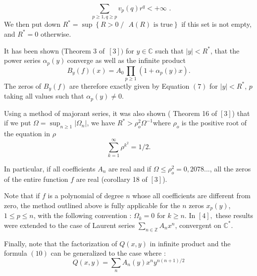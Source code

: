 \documentclass{article}
\begin{document}
\begin{equation}
\text{\ \ }\sum\limits_{p\geq 1,q\geq p}v_{p}\left( q\right) r^{q}<+\infty 
\text{ .}
\end{equation}
We then put down $R^{\ast }=\sup \left\{ R>0\;/\text{ }A\left( R\right) 
\text{ is true}\right\} $ if this set is not empty, and $R^{\ast }=0$
otherwise.

It has been shown (Theorem 3 of\ $\left[ 3\right] )$ for $y\in \mathbb{C}$
such that $\left| y\right| <R^{\ast }$, that the power series $\alpha
_{p}\left( y\right) \ $converge as well as the infinite product 
\begin{equation}
B_{y}\left( f\right) \left( x\right) =A_{0}\prod\limits_{p\geq 1}\left(
1+\alpha _{p}\left( y\right) x\right) \text{.}
\end{equation}
The zeros of $B_{y}\left( f\right) $ are therefore exactly given by Equation 
$\left( 7\right) $ for $\left| y\right| <R^{\ast }$, $p$ taking all values
such that $\alpha _{p}\left( y\right) \neq 0$.

Using a method of majorant series, it was also shown ( Theorem 16 of $\left[
3\right] $) that if we put $\Omega =\sup_{n\geq 1}\left| \Omega _{n}\right| $, we have $R^{\ast }>\rho _{o}^{2}\Omega ^{-1}$where $\rho _{o}$ is the
positive root of the equation in $\rho $ 
\begin{equation}
\sum_{k=1}^{\infty }\rho ^{k^{2}}=1/2.
\end{equation}

In particular, if all coefficients $A_{n}$ are real and if $\Omega \leq \rho
_{o}^{2}=0,2078...$, all the zeros of the entire function $f$ are real
(corollary 18 of $\left[ 3\right] $).

Note that if $f$ is a polynomial of degree $n$ whose all coefficients are
different from zero, the method outlined above is fully applicable for the $n $ zeros $x_{p}\left( y\right) $, $1\leq p\leq n$, with the following
convention : $\Omega _{k}=0$ for $k\geq n$. In $\left[ 4\right] ,$ these
results were extended to the case of Laurent series $\sum_{n\in \mathbb{Z}}A_{n}x^{n}$, convergent on $\mathbb{C}^{\ast }$.

Finally, note that the factorization of $Q\left( x,y\right) $ in infinite
product and the formula $\left( 10\right) $ can be generalized to the case
where : 
\begin{equation*}
Q\left( x,y\right) =\sum_{n}A_{n}\left( y\right) x^{n}y^{n\left( n+1\right)
/2}
\end{equation*}
\end{document}
